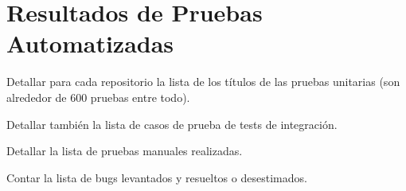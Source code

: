 \chapter{Resultados de Pruebas Automatizadas}
\label{cp:automated-tests-execution}

Detallar para cada repositorio la lista de los títulos de las pruebas unitarias (son alrededor de 600 pruebas entre todo). 

Detallar también la lista de casos de prueba de tests de integración.

Detallar la lista de pruebas manuales realizadas.

Contar la lista de bugs levantados y resueltos o desestimados.
